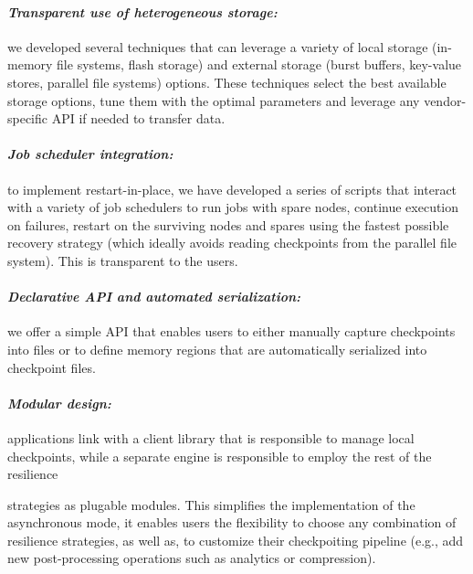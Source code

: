 \paragraph{\emph{Transparent use of heterogeneous storage:}} we
developed several techniques that can leverage a variety of local
storage (in-memory file systems, flash storage) and external storage
(burst buffers, key-value stores, parallel file systems)
options. These techniques select the best available storage options,
tune them with the optimal parameters and leverage any vendor-specific
API if needed to transfer data.
\vspace{-1em}

\paragraph{\emph{Job scheduler integration:}} to implement
restart-in-place, we have developed a series of scripts that interact
with a variety of job schedulers to run jobs with spare nodes,
continue execution on failures, restart on the surviving nodes and
spares using the fastest possible recovery strategy (which ideally
avoids reading checkpoints from the parallel file system). This is
transparent to the users.
\vspace{-1em}

\paragraph{\emph{Declarative API and automated serialization:}} we
offer a simple API that enables users to either manually capture
checkpoints into files or to define memory regions that are
automatically serialized into checkpoint files.
\vspace{-1em}

\paragraph{\emph{Modular design:}} applications link with a client
library that is responsible to manage local checkpoints, while a
separate engine is responsible to employ the rest of the resilience

strategies as plugable modules. This simplifies the implementation
of the asynchronous mode, it enables users the flexibility to choose any
combination of resilience strategies, as well as, to customize their
checkpoiting pipeline (e.g., add new post-processing operations such
as analytics or compression).

